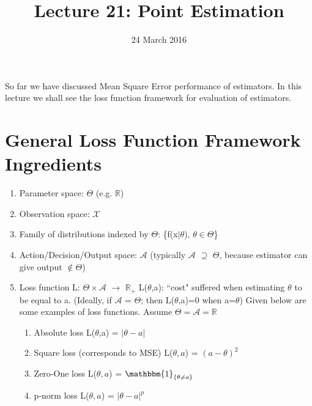 \documentclass[a4paper,english,12pt]{article}
\title{Lecture 21: Point Estimation}
\date{24 March 2016}
\begin{document}
\author{}
\maketitle
So far we have discussed Mean Square Error performance of estimators. In this lecture we shall see the loss function framework for evaluation of estimators.

\section{General Loss Function Framework Ingredients}
\begin{enumerate}
\item Parameter space: $\Theta$ (e.g. $\mathbb{R}$)
\item Observation space: $\mathscr{X}$
\item Family of distributions indexed by $\Theta$: \{f(x$\vert\theta$), $\theta\in\Theta$\}
\item Action/Decision/Output space: $\mathscr{A}$ \newline\hspace*{3cm}(typically $\mathscr{A}$ $\supseteq$ $\Theta$, because estimator can give output $\notin \Theta$)
\item Loss function
\newline\hspace*{2cm} L: $\Theta \times\mathscr{A}$ $\rightarrow$ $\mathbb{R}_+$
\newline L($\theta$,a): \textquotedblleft cost" suffered when estimating $\theta$ to be equal to a.
\newline (Ideally, if $\mathscr{A}$ = $\Theta$; then L($\theta$,a)=0 when a=$\theta$)
\newline\newline Given below are some examples of loss functions.
\newline\hspace*{2cm} Assume $\Theta = \mathscr{A} = \mathbb{R}$
\begin{enumerate}
	\item Absolute loss
	\newline\hspace*{2cm} L($\theta$,a) = $\vert\theta-a\vert$
	\item Square loss (corresponds to MSE)
	\newline\hspace*{2cm} L($\theta,a$) = $(a-\theta)^2$ 
	\item Zero-One loss
	\newline\hspace*{2cm} L($\theta,a$) = $\mathbbm{1}_{\{\theta \neq a\}}$ 
	\item p-norm loss
	\newline\hspace*{2cm} L($\theta,a$) = $\vert\theta - a\vert^p$
\end{enumerate}
\end{enumerate}
\end{document}
